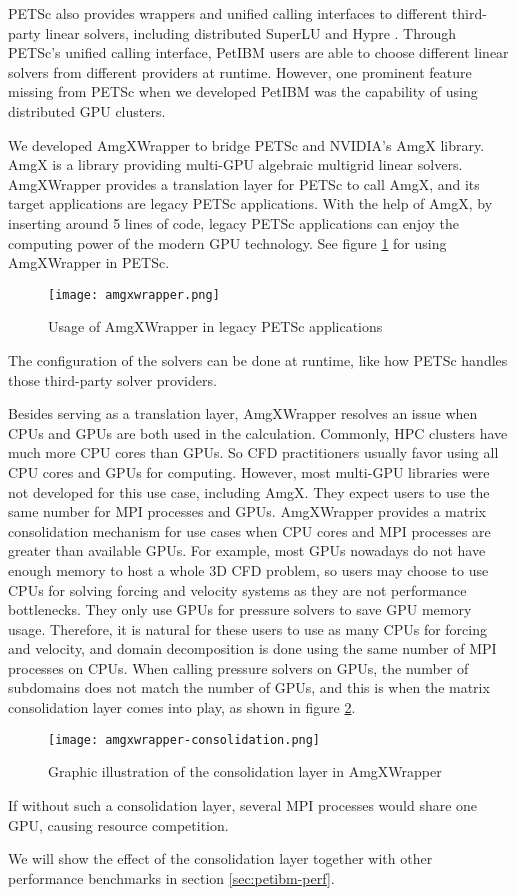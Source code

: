 PETSc also provides wrappers and unified calling interfaces to different third-party linear solvers, including distributed SuperLU \cite{sao_communication-avoiding_2019} and Hypre \cite{noauthor_hypre_nodate}.
Through PETSc's unified calling interface, PetIBM users are able to choose different linear solvers from different providers at runtime. 
However, one prominent feature missing from PETSc when we developed PetIBM was the capability of using distributed GPU clusters.

We developed AmgXWrapper \cite{chuang_geoclaw-arcgis_2019} to bridge PETSc and NVIDIA's AmgX library.
AmgX is a library providing multi-GPU algebraic multigrid linear solvers.
AmgXWrapper provides a translation layer for PETSc to call AmgX, and its target applications are legacy PETSc applications. 
With the help of AmgX, by inserting around 5 lines of code, legacy PETSc applications can enjoy the computing power of the modern GPU technology.
See figure \ref{fig:amgxwrapper} for using AmgXWrapper in PETSc.
\begin{figure}[hbt!]
    \texttt{[image: amgxwrapper.png]}
    \caption{Usage of AmgXWrapper in legacy PETSc applications}
    \label{fig:amgxwrapper}
\end{figure}
The configuration of the solvers can be done at runtime, like how PETSc handles those third-party solver providers.

Besides serving as a translation layer, AmgXWrapper resolves an issue when CPUs and GPUs are both used in the calculation.
Commonly, HPC clusters have much more CPU cores than GPUs.
So CFD practitioners usually favor using all CPU cores and GPUs for computing.
However, most multi-GPU libraries were not developed for this use case, including AmgX.
They expect users to use the same number for MPI processes and GPUs.
AmgXWrapper provides a matrix consolidation mechanism for use cases when CPU cores and MPI processes are greater than available GPUs.
For example, most GPUs nowadays do not have enough memory to host a whole 3D CFD problem, so users may choose to use CPUs for solving forcing and velocity systems as they are not performance bottlenecks.
They only use GPUs for pressure solvers to save GPU memory usage.
Therefore, it is natural for these users to use as many CPUs for forcing and velocity, and domain decomposition is done using the same number of MPI processes on CPUs.
When calling pressure solvers on GPUs, the number of subdomains does not match the number of GPUs, and this is when the matrix consolidation layer comes into play, as shown in figure \ref{fig:amgxwrapper-consolidation}.
\begin{figure}[hbt!]
    \texttt{[image: amgxwrapper-consolidation.png]}
    \caption{Graphic illustration of the consolidation layer in AmgXWrapper}
    \label{fig:amgxwrapper-consolidation}
\end{figure}
If without such a consolidation layer, several MPI processes would share one GPU, causing resource competition.

We will show the effect of the consolidation layer together with other performance benchmarks in section \ref{sec:petibm-perf}.
